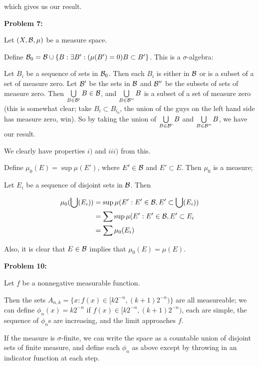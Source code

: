 \documentclass[a4paper,12pt]{article}
\begin{document}
which gives us our result.

\shunt

{\bf Problem 7:}

Let $(X, \mathcal{B}, \mu)$ be a measure space.

Define $\mathcal{B}_0 = \mathcal{B} \cup \{B: \exists B': (\mu(B')=0) B \subset B' \}$. This is a $\sigma$-algebra: 

Let $B_i$ be a sequence of sets in $\mathcal{B}_0$. Then each $B_i$ is either in $\mathcal{B}$ or is a subset of a set of measure zero. Let $\mathcal{B}'$ be the sets in $\mathcal{B}$ and $\mathcal{B}''$ be the subsets of sets of measure zero. Then $\bigcup\limits_{B \in \mathcal{B}'} B \in \mathcal{B}$, and $\bigcup\limits_{B \in \mathcal{B}''} B$ is a subset of a set of measure zero (this is somewhat clear; take $B_i \subset B_{i_0}$, the union of the guys on the left hand side has measure zero, win). So by taking the union of $\bigcup\limits_{B \in \mathcal{B}'} B$ and $\bigcup\limits_{B \in \mathcal{B}''} B$, we have our result.

We clearly have properties $i)$ and $iii)$ from this.

Define $\mu_0(E) = \sup \mu(E')$, where $E' \in \mathcal{B}$ and $E' \subset E$. Then $\mu_0$ is a measure;

Let $E_i$ be a sequence of disjoint sets in $\mathcal{B}$. Then 

\begin{align*}
\mu_0(\bigcup(E_i)) &= \sup \mu(E': E' \in \mathcal{B}, E' \subset \bigcup(E_i))\\
&= \sum \sup \mu(E': E' \in \mathcal{B}, E' \subset E_i\\
&= \sum \mu_0(E_i)
\end{align*} %

Also, it is clear that $E \in \mathcal{B}$ implies that $\mu_0(E) = \mu(E)$.

\shunt

{\bf Problem 10:}

Let $f$ be a nonnegative measurable function. 

Then the sets $A_{n,k}=\{x: f(x) \in [k2^{-n}, (k+1)2^{-n})\}$ are all measureable; we can define $\phi_n(x) = k2^{-n}$ if $f(x) \in [k2^{-n}, (k+1)2^{-n})$, each are simple, the sequence of $\phi_n$s are increasing, and the limit approaches $f$. 

If the measure is $\sigma$-finite, we can write the space as a countable union of disjoint sets of finite measure, and define each $\phi_n$ as above except by throwing in an indicator function at each step. 
\end{document}
